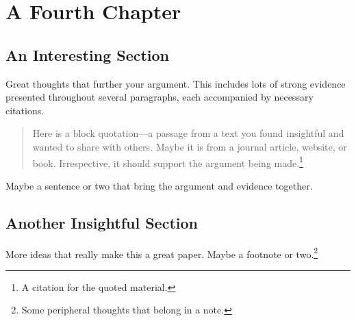 \chapter{A Fourth Chapter}
\label{chapter:four}


\section{An Interesting Section}

Great thoughts that further your argument. This includes lots of strong evidence presented throughout several paragraphs, each accompanied by necessary citations.
\begin{quotation}
    \noindent Here is a block quotation---a passage from a text you found insightful and wanted to share with others. Maybe it is from a journal article, website, or book. Irrespective, it should support the argument being made.\footnote{A citation for the quoted material.}
\end{quotation}
Maybe a sentence or two that bring the argument and evidence together.\citep{dos_santos_2020}



\section{Another Insightful Section}

More ideas that really make this a great paper. Maybe a footnote or two.\footnote{Some peripheral thoughts that belong in a note.}
